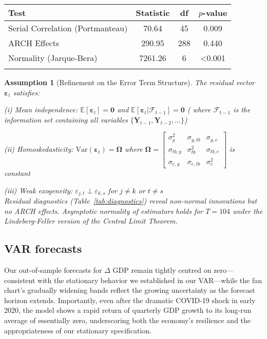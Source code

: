 \documentclass[
]{article}
\let\oldtable\table
\let\endoldtable\endtable
\renewenvironment{table}[1][H]{\oldtable[H]}{\endoldtable}
\newtheorem{assumption}{Assumption} %
\begin{document}
\begin{table}[!htbp]
\centering
\caption{\textsc{Residual Diagnostic Tests}}
\label{tab:diagnostics}
\small
\begin{tabular}{@{}lSSS@{}}
\hline \hline
\textbf{Test} & \textbf{Statistic} & \textbf{df} & \textbf{$p$-value} \\ 
\midrule
Serial Correlation (Portmanteau) & 70.64 & 45 & 0.009 \\
ARCH Effects & 290.95 & 288 & 0.440 \\
Normality (Jarque-Bera) & 7261.26 & 6 & <0.001 \\
 \hline \hline  \\
\end{tabular}
\end{table}

\begin{assumption}[Refinement on the Error Term Structure]\label{assump:errors}
The residual vector $\bm{\varepsilon}_t$ satisfies: 

(i) Mean independence: $\mathbb{E}[\bm{\varepsilon}_t] = 
\bm{0}$ and $\mathbb{E}[\bm{\varepsilon}_t|\mathcal{F}_{t-1}] = \bm{0}$ ( where 
$\mathcal{F}_{t-1}$ is the information set containing all variables $\{\bm{Y}_{t-1}, \bm{Y}_{t-2}, \dots\}$)

(ii) Homoskedasticity: $\text{Var}(\bm{\varepsilon}_t) = \bm{\Omega}$ where 
$\bm{\Omega} = \begin{bmatrix}
\sigma^2_y & \sigma_{y,tb} & \sigma_{y,e} \\
\sigma_{tb,y} & \sigma^2_{tb} & \sigma_{tb,e} \\
\sigma_{e,y} & \sigma_{e,tb} & \sigma^2_e
\end{bmatrix}$ is constant 

(iii) Weak exogeneity: $\varepsilon_{j,t} \perp \varepsilon_{k,s}$ for $j \neq k$ or $t \neq s$ \\
Residual diagnostics (Table~\ref{tab:diagnostics}) reveal non-normal innovations but no ARCH effects.
Asymptotic normality of estimators holds for $T=104$ under the Lindeberg-Feller version of the Central Limit Theorem.
\end{assumption}


\subsection{VAR forecasts}

Our out-of-sample forecasts for $\Delta$ GDP remain tightly centred on zero—consistent 
with the stationary behavior we established in our VAR—while the fan chart’s 
gradually widening bands reflect the growing uncertainty as the forecast 
horizon extends. Importantly, even after the dramatic COVID-19 shock in early 
2020, the model shows a rapid return of quarterly GDP growth to its long-run 
average of essentially zero, underscoring both the economy’s resilience and 
the appropriateness of our stationary specification.
\end{document}
